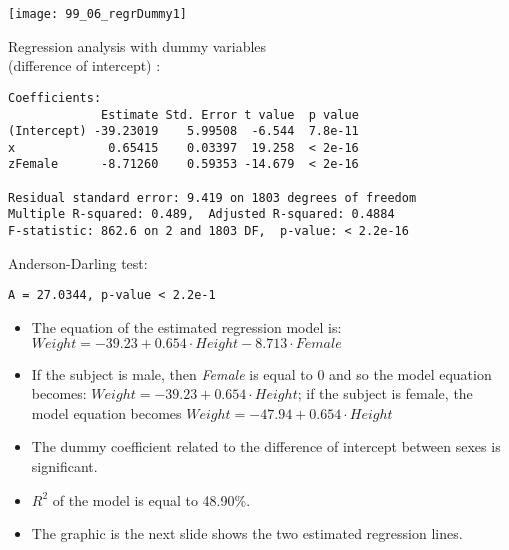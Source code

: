 \begin{frame}
  \vspace{-0.3cm}
  \begin{center}
    \texttt{[image: 99\_06\_regrDummy1]}
  \end{center}
\end{frame}

\begin{frame}[fragile]
  Regression analysis with dummy variables\\ (difference of intercept) :\\
  \begin{small}
    \begin{verbatim}
Coefficients:
             Estimate Std. Error t value  p value   
(Intercept) -39.23019    5.99508  -6.544  7.8e-11
x             0.65415    0.03397  19.258  < 2e-16
zFemale      -8.71260    0.59353 -14.679  < 2e-16

Residual standard error: 9.419 on 1803 degrees of freedom
Multiple R-squared: 0.489,	Adjusted R-squared: 0.4884 
F-statistic: 862.6 on 2 and 1803 DF,  p-value: < 2.2e-16 
    \end{verbatim}
  \end{small}
  Anderson-Darling test:\\
  \begin{small}
    \begin{verbatim}
A = 27.0344, p-value < 2.2e-1
    \end{verbatim}
  \end{small}
\end{frame}

\begin{frame}
  \vspace{0.5cm}
  \begin{itemize}
    \item The equation of the estimated regression model is: $ Weight = -39.23 + 0.654 \cdot Height - 8.713 \cdot Female $
    \item If the subject is male, then \textit{Female} is equal to 0 and so the model equation becomes: $ Weight = -39.23 + 0.654 \cdot Height $; if the subject is female, the model equation becomes  $ Weight = -47.94 + 0.654 \cdot Height $
    \item The dummy coefficient related to the difference of intercept between sexes is significant.
    \item $R^2$ of the model is equal to 48.90\%.
    \item The graphic is the next slide shows the two estimated regression lines.
  \end{itemize}
\end{frame}

